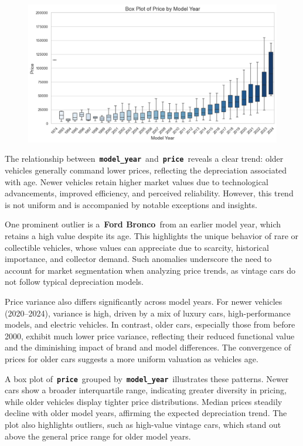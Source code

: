 \documentclass[a4paper,oneside,bibliography=totoc]{scrbook}
\begin{document}
\begin{figure}
	\includegraphics[width=\linewidth]{images/modelyear_price.png}
	\centering
\end{figure}

The relationship between~\textbf{\texttt{model\_year}}~and~\textbf{\texttt{price}}~reveals a clear trend: older vehicles generally command lower prices, reflecting the depreciation associated with age. Newer vehicles retain higher market values due to technological advancements, improved efficiency, and perceived reliability. However, this trend is not uniform and is accompanied by notable exceptions and insights.

One prominent outlier is a~\textbf{Ford Bronco}~from an earlier model year, which retains a high value despite its age. This highlights the unique behavior of rare or collectible vehicles, whose values can appreciate due to scarcity, historical importance, and collector demand. Such anomalies underscore the need to account for market segmentation when analyzing price trends, as vintage cars do not follow typical depreciation models.

Price variance also differs significantly across model years. For newer vehicles (2020--2024), variance is high, driven by a mix of luxury cars, high-performance models, and electric vehicles. In contrast, older cars, especially those from before 2000, exhibit much lower price variance, reflecting their reduced functional value and the diminishing impact of brand and model differences. The convergence of prices for older cars suggests a more uniform valuation as vehicles age.

A box plot of~\textbf{\texttt{price}}~grouped by~\textbf{\texttt{model\_year}}~illustrates these patterns. Newer cars show a broader interquartile range, indicating greater diversity in pricing, while older vehicles display tighter price distributions. Median prices steadily decline with older model years, affirming the expected depreciation trend. The plot also highlights outliers, such as high-value vintage cars, which stand out above the general price range for older model years.
\end{document}
